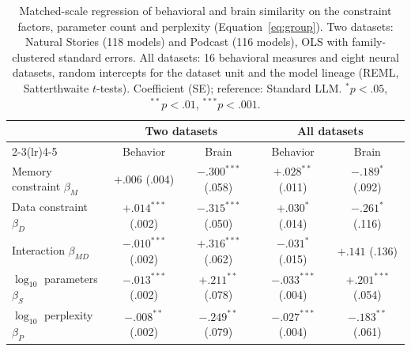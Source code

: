 \begin{table}[t]
\centering
\small
\setlength{\tabcolsep}{5pt}
\caption{Matched-scale regression of behavioral and brain similarity on the constraint factors, parameter count and
perplexity (Equation~\ref{eq:group}). Two datasets: Natural Stories (118 models) and Podcast (116 models), OLS with
family-clustered standard errors. All datasets: 16 behavioral measures and eight neural datasets, random intercepts for the
dataset unit and the model lineage (REML, Satterthwaite $t$-tests). Coefficient (SE); reference: Standard LLM. $^{*}p<.05$, $^{**}p<.01$, $^{***}p<.001$.}
\label{tab:rsa-main}
\begin{tabular}{lcccc}
\toprule
 & \multicolumn{2}{c}{Two datasets} & \multicolumn{2}{c}{All datasets} \\
\cmidrule(lr){2-3}\cmidrule(lr){4-5}
 & Behavior & Brain & Behavior & Brain \\
\midrule
Memory constraint $\beta_M$ & $+.006$ (.004) & $-.300^{***}$ (.058) & $+.028^{**}$ (.011) & $-.189^{*}$ (.092) \\
Data constraint $\beta_D$ & $+.014^{***}$ (.002) & $-.315^{***}$ (.050) & $+.030^{*}$ (.014) & $-.261^{*}$ (.116) \\
Interaction $\beta_{MD}$ & $-.010^{***}$ (.002) & $+.316^{***}$ (.062) & $-.031^{*}$ (.015) & $+.141$ (.136) \\
$\log_{10}$ parameters $\beta_S$ & $-.013^{***}$ (.002) & $+.211^{**}$ (.078) & $-.033^{***}$ (.004) & $+.201^{***}$ (.054) \\
$\log_{10}$ perplexity $\beta_P$ & $-.008^{**}$ (.002) & $-.249^{**}$ (.079) & $-.027^{***}$ (.004) & $-.183^{**}$ (.061) \\
\bottomrule
\end{tabular}
\end{table}
